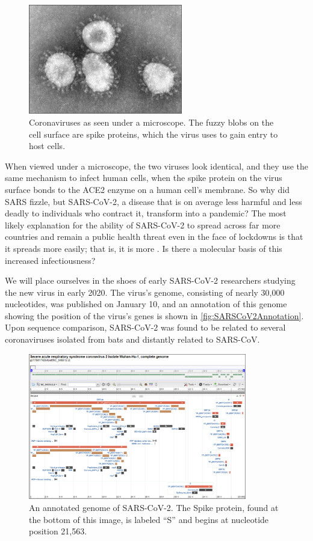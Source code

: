 \begin{figure}[h]
	\centering
	\mySfFamily
	\includegraphics[width = 0.6\textwidth]{../images/coronavirus.png}
	\caption{Coronaviruses as seen under a microscope. The fuzzy blobs on the cell surface are spike proteins, which the virus uses to gain entry to host cells.}
	\label{fig:coronavirus}
\end{figure}

When viewed under a microscope, the two viruses look identical, and they use the same mechanism to infect human cells, when the spike protein on the virus surface bonds to the ACE2 enzyme on a human cell's membrane. So why did SARS fizzle, but SARS-CoV-2, a disease that is on average less harmful and less deadly to individuals who contract it, transform into a pandemic? The most likely explanation for the ability of SARS-CoV-2 to spread across far more countries and remain a public health threat even in the face of lockdowns is that it spreads more easily; that is, it is more . Is there a molecular basis of this increased infectiousness?

We will place ourselves in the shoes of early SARS-CoV-2 researchers studying the new virus in early 2020. The virus's genome, consisting of nearly 30,000 nucleotides, was published on January 10, and an annotation of this genome showing the position of the virus's genes is shown in \autoref{fig:SARSCoV2Annotation}. Upon sequence comparison, SARS-CoV-2 was found to be related to several coronaviruses isolated from bats and distantly related to SARS-CoV.

\begin{figure}[h]
	\centering
	\mySfFamily
	\includegraphics[width = 0.85\textwidth]{../images/SARSCoV2Annotation.png}
	\caption{An annotated genome of SARS-CoV-2. The Spike protein, found at the bottom of this image, is labeled ``S'' and begins at nucleotide position 21,563.}
	\label{fig:SARSCoV2Annotation}
\end{figure}

